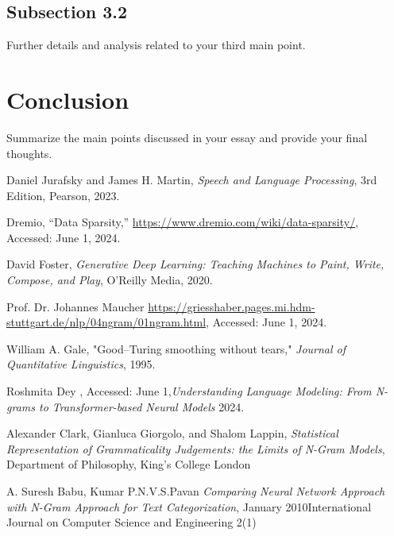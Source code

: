 \documentclass[12pt]{article}
\begin{document}
\subsection{Subsection 3.2}
Further details and analysis related to your third main point.

\section{Conclusion}
Summarize the main points discussed in your essay and provide your final thoughts.

\clearpage
\begin{thebibliography}{9}

	Daniel Jurafsky and James H. Martin, \textit{Speech and Language Processing}, 3rd Edition, Pearson, 2023.

	Dremio, ``Data Sparsity,'' \url{https://www.dremio.com/wiki/data-sparsity/}, Accessed: June 1, 2024.

	David Foster, \textit{Generative Deep Learning: Teaching Machines to Paint, Write, Compose, and Play}, O'Reilly Media, 2020.

	Prof. Dr. Johannes Maucher \url{https://griesshaber.pages.mi.hdm-stuttgart.de/nlp/04ngram/01ngram.html}, Accessed: June 1, 2024.

	William A. Gale, "Good–Turing smoothing without tears," \textit{Journal of Quantitative Linguistics}, 1995.

	Roshmita Dey , Accessed: June 1,\textit{Understanding Language Modeling: From N-grams to Transformer-based Neural Models} 2024.

	Alexander Clark, Gianluca Giorgolo, and Shalom Lappin, \textit{Statistical Representation of Grammaticality Judgements: the Limits of
		N-Gram Models}, Department of Philosophy, King’s College London

	A. Suresh Babu, Kumar P.N.V.S.Pavan
	\textit{Comparing Neural Network Approach with N-Gram Approach for Text Categorization},     January 2010International Journal on Computer Science and Engineering 2(1)

\end{thebibliography}
\end{document}
